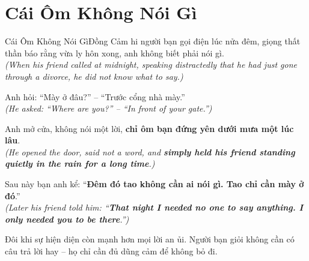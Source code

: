 \section{Cái Ôm Không Nói Gì}
\begin{truyen}{Cái Ôm Không Nói Gì}{Đồng Cảm}
hi người bạn gọi điện lúc nửa đêm, giọng thất thần báo rằng vừa ly hôn xong, anh không biết phải nói gì.\\
\textit{(When his friend called at midnight, speaking distractedly that he had just gone through a divorce, he did not know what to say.)}

Anh hỏi: ``Mày ở đâu?'' – ``Trước cổng nhà mày.''\\
\textit{(He asked: ``Where are you?'' – ``In front of your gate.'')}

Anh mở cửa, không nói một lời, \textbf{chỉ ôm bạn đứng yên dưới mưa một lúc lâu}.\\
\textit{(He opened the door, said not a word, and \textbf{simply held his friend standing quietly in the rain for a long time}.)}

Sau này bạn anh kể: ``\textbf{Đêm đó tao không cần ai nói gì. Tao chỉ cần mày ở đó}.''\\
\textit{(Later his friend told him: ``\textbf{That night I needed no one to say anything. I only needed you to be there}.'')}
\end{truyen}
\begin{baihoc}
  Đôi khi sự hiện diện còn mạnh hơn mọi lời an ủi. Người bạn giỏi không cần có câu trả lời hay – họ chỉ cần đủ dũng cảm để không bỏ đi.
\end{baihoc}

